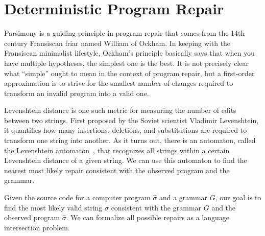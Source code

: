 \chapter{\rm\bfseries Deterministic Program Repair}
\label{ch:chapter02}

Parsimony is a guiding principle in program repair that comes from the 14th century Fransiscan friar named William of Ockham. In keeping with the Fransiscan minimalist lifestyle, Ockham's principle basically says that when you have multiple hypotheses, the simplest one is the best. It is not precisely clear what ``simple'' ought to mean in the context of program repair, but a first-order approximation is to strive for the smallest number of changes required to transform an invalid program into a valid one.

Levenshtein distance is one such metric for measuring the number of edits between two strings. First proposed by the Soviet scientist Vladimir Levenshtein, it quantifies how many insertions, deletions, and substitutions are required to transform one string into another. As it turns out, there is an automaton, called the Levenshtein automaton~\cite{schulz2002fast}, that recognizes all strings within a certain Levenshtein distance of a given string. We can use this automaton to find the nearest most likely repair consistent with the observed program and the grammar.

Given the source code for a computer program $\hat\sigma$ and a grammar $G$, our goal is to find the most likely valid string $\sigma$ consistent with the grammar $G$ and the observed program $\hat\sigma$. We can formalize all possible repairs as a language intersection problem.